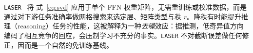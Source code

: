 

\texttt{LASER}~\citep{LASER_2024} 将
式~\ref{eq:svd} 应用于单个 FFN 权重矩阵，无需重训练或校准数据，而是通过对下游任务准确率做网格搜索来选定层、矩阵类型与秩 $r$。降秩有时能提升推理（reasoning）任务的性能，这被解释为一种\emph{去噪}效应：据推测，低奇异值方向编码了相互竞争的回应，会压制学习不充分的事实。\texttt{LASER} 不对截断误差做任何修正，因而是一个自然的免训练基线。


